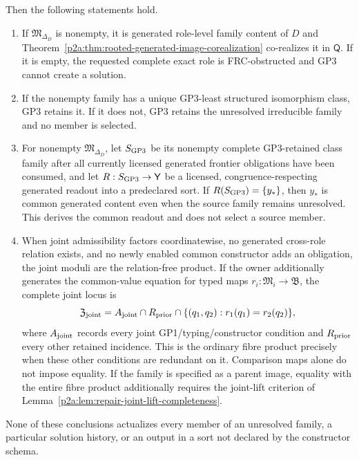 \documentclass[12pt,a4paper]{article}
\begin{document}
\begin{theorem}
Then the following statements hold.
\begin{enumerate}[label=(\roman*),leftmargin=2em]
\item If \(\mathfrak M_{\Delta_D}\) is nonempty, it is generated role-level
      family content of \(D\) and
      Theorem~\ref{p2a:thm:rooted-generated-image-corealization} co-realizes it
      in \(\mathsf Q\).  If it is empty, the requested complete exact role is
      FRC-obstructed and GP3 cannot create a solution.
\item If the nonempty family has a unique GP3-least structured isomorphism
      class, GP3 retains it.  If it does not, GP3 retains the unresolved
      irreducible family and no member is selected.
\item For nonempty \(\mathfrak M_{\Delta_D}\), let
      \(S_{\rm GP3}\) be its nonempty complete GP3-retained class family
      after all currently licensed generated frontier obligations have been
      consumed, and let
      \(R:S_{\rm GP3}\to\mathsf Y\) be a licensed, congruence-respecting
      generated readout into a predeclared sort.  If
      \(R(S_{\rm GP3})=\{y_*\}\), then \(y_*\) is common generated content
      even when the source family remains unresolved.  This derives the
      common readout and does not select a source member.
\item When joint admissibility factors coordinatewise, no generated
      cross-role relation exists, and no newly enabled common constructor
      adds an obligation, the joint moduli are the relation-free product.
      If the owner additionally generates the common-value equation for
      typed maps \(r_i:\mathfrak M_i\to\mathfrak B\), the complete joint locus is
      \[
        \mathfrak Z_{\rm joint}
        =A_{\rm joint}\cap R_{\rm prior}\cap
          \{(q_1,q_2):r_1(q_1)=r_2(q_2)\},
      \]
      where \(A_{\rm joint}\) records every joint GP1/typing/constructor
      condition and \(R_{\rm prior}\) every other retained incidence.
      This is the ordinary fibre product precisely when these other
      conditions are redundant on it. Comparison maps alone do not impose
      equality. If the family is specified as a parent image, equality with
      the entire fibre product additionally requires the joint-lift criterion
      of Lemma~\ref{p2a:lem:repair-joint-lift-completeness}.
\end{enumerate}
None of these conclusions actualizes every member of an unresolved family, a
particular solution history, or an output in a sort not declared by the
constructor schema.
\end{theorem}
\end{document}

